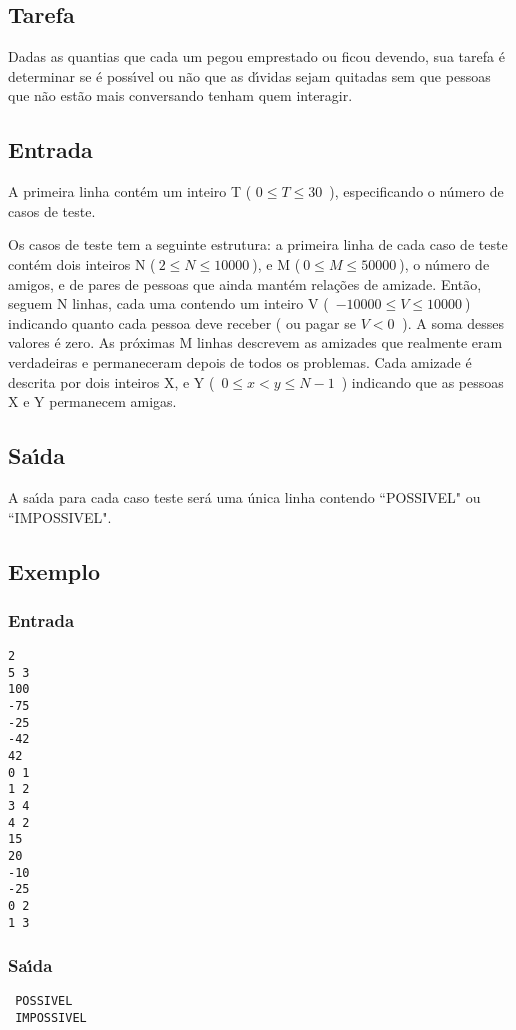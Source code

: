 \documentclass[14pt]{article}
\begin{document}
\subsection{Tarefa}
Dadas as quantias que cada um pegou emprestado ou ficou devendo, sua tarefa \'e determinar se \'e poss\'{\i}vel ou n\~ao que as d\'{\i}vidas sejam quitadas sem que pessoas que n\~ao est\~ao mais conversando tenham quem interagir.

\subsection{Entrada}
A primeira linha cont\'em um inteiro T ( $0 \leqslant T \leqslant 30$\ ), especificando o n\'umero de casos de teste.

Os casos de teste tem a seguinte estrutura: a primeira linha de cada caso de teste cont\'em dois inteiros N ($\ 2 \leqslant N \leqslant 10000\ $), e M ($\ 0 \leqslant M \leqslant 50000\ $), o n\'umero de amigos, e de pares de pessoas que ainda mant\'em rela\c{c}\~oes de amizade. Ent\~ao, seguem N linhas, cada uma contendo um inteiro V (\ $-10000 \leqslant V \leqslant 10000\ $) indicando quanto cada pessoa deve receber ( ou pagar se $ V < 0\ $ ). A soma desses valores \'e zero. As pr\'oximas M linhas descrevem as amizades que realmente eram verdadeiras e permaneceram depois de todos os problemas. Cada amizade \'e descrita por dois inteiros X, e Y (\ $0 \leqslant x < y \leqslant N-1$\ ) indicando que as pessoas X e Y permanecem amigas.

\subsection{Sa\'{\i}da}
A sa\'{\i}da para cada caso teste ser\'a uma \'unica linha contendo ``POSSIVEL" ou ``IMPOSSIVEL".

\subsection{Exemplo}
\subsubsection{Entrada}
\begin{verbatim}
2
5 3
100
-75
-25
-42
42
0 1
1 2
3 4
4 2
15
20
-10
-25
0 2
1 3
 \end{verbatim}
\subsubsection{Sa\'{\i}da}
 \begin{verbatim}
 POSSIVEL
 IMPOSSIVEL
 \end{verbatim}
\end{document}
